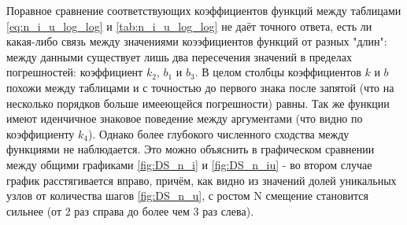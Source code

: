 Поравное сравнение соответствующих коэффициентов функций между таблицами \ref{eq:n_i_u_log_log} и \ref{tab:n_i_u_log_log} не даёт точного ответа, есть ли какая-либо связь между значениями коээфициентов функций от разных "длин": 
между данными существует лишь два пересечения значений в пределах погрешностей: коэффициент $k_2$, $b_1$ и $b_3$. 
В целом столбцы коэффициентов $k$ и $b$ похожи между таблицами и с точностью до первого знака после запятой (что на несколько порядков больше имееющейся погрешности) равны. Так же функции имеют иденчичное знаковое поведение между аргументами (что видно по коэффициенту $k_4$).
Однако более глубокого численного сходства между функциями не наблюдается.
Это можно объяснить в графическом сравнении между общими графиками \ref{fig:DS_n_i} и \ref{fig:DS_n_iu} - во втором случае график расстягивается вправо, причём, как видно из значений долей уникальных узлов от количества шагов \ref{fig:DS_n_u}, с ростом N смещение становится сильнее (от 2 раз справа до более чем 3 раз слева).


\newpage 